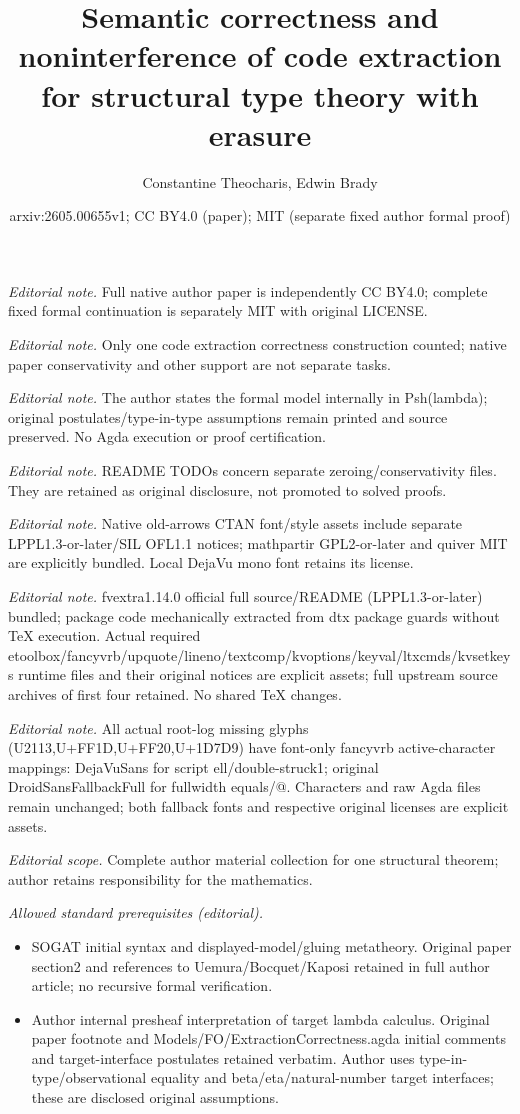 \documentclass[10pt,a4paper]{article}
\title{Semantic correctness and noninterference of code extraction for structural type theory with erasure}
\author{Constantine Theocharis, Edwin Brady}
\date{arxiv:2605.00655v1; CC BY4.0 (paper); MIT (separate fixed author formal proof)}
\theoremstyle{definition}
\theoremstyle{remark}
\begin{document}
\maketitle
\noindent\textit{Editorial note.} Full native author paper is independently CC BY4.0; complete fixed formal continuation is separately MIT with original LICENSE.\par\medskip
\noindent\textit{Editorial note.} Only one code extraction correctness construction counted; native paper conservativity and other support are not separate tasks.\par\medskip
\noindent\textit{Editorial note.} The author states the formal model internally in Psh(lambda); original postulates/type-in-type assumptions remain printed and source preserved. No Agda execution or proof certification.\par\medskip
\noindent\textit{Editorial note.} README TODOs concern separate zeroing/conservativity files. They are retained as original disclosure, not promoted to solved proofs.\par\medskip
\noindent\textit{Editorial note.} Native old-arrows CTAN font/style assets include separate LPPL1.3-or-later/SIL OFL1.1 notices; mathpartir GPL2-or-later and quiver MIT are explicitly bundled. Local DejaVu mono font retains its license.\par\medskip
\noindent\textit{Editorial note.} fvextra1.14.0 official full source/README (LPPL1.3-or-later) bundled; package code mechanically extracted from dtx package guards without TeX execution. Actual required etoolbox/fancyvrb/upquote/lineno/textcomp/kvoptions/keyval/ltxcmds/kvsetkeys runtime files and their original notices are explicit assets; full upstream source archives of first four retained. No shared TeX changes.\par\medskip
\noindent\textit{Editorial note.} All actual root-log missing glyphs (U2113,U+FF1D,U+FF20,U+1D7D9) have font-only fancyvrb active-character mappings: DejaVuSans for script ell/double-struck1; original DroidSansFallbackFull for fullwidth equals/@. Characters and raw Agda files remain unchanged; both fallback fonts and respective original licenses are explicit assets.\par\medskip
\noindent\textit{Editorial scope.} Complete author material collection for one structural theorem; author retains responsibility for the mathematics.\par\medskip
\noindent\textit{Allowed standard prerequisites (editorial).}\begin{itemize}
\item SOGAT initial syntax and displayed-model/gluing metatheory. Original paper section2 and references to Uemura/Bocquet/Kaposi retained in full author article; no recursive formal verification.
\item Author internal presheaf interpretation of target lambda calculus. Original paper footnote and Models/FO/ExtractionCorrectness.agda initial comments and target-interface postulates retained verbatim. Author uses type-in-type/observational equality and beta/eta/natural-number target interfaces; these are disclosed original assumptions.
\end{itemize}\medskip
\end{document}
